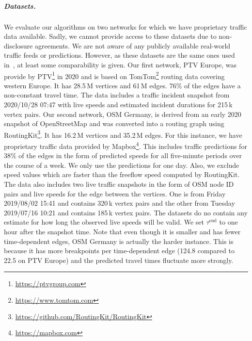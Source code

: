 \documentclass[a4paper,UKenglish,cleveref, autoref, thm-restate,anonymous]{lipics-v2021}
\begin{document}
\subparagraph{Datasets.}
We evaluate our algorithms on two networks for which we have proprietary traffic data available.
Sadly, we cannot provide access to these datasets due to non-disclosure agreements.
We are not aware of any publicly available real-world traffic feeds or predictions.
However, as these datasets are the same ones used in~\cite{swz-sfert-21,strasser_et_al:LIPIcs.SEA.2021.6}, at least some comparability is given.
%
Our first network, PTV Europe, was provide by PTV\footnote{\url{https://ptvgroup.com}} in 2020 and is based on TomTom\footnote{\url{https://www.tomtom.com}} routing data covering western Europe.
It has 28.5\,M vertices and 61\,M edges.
76\% of the edges have a non-constant travel time.
The data includes a traffic incident snapshot from 2020/10/28 07:47 with live speeds and estimated incident durations for 215\,k vertex pairs.
%
Our second network, OSM Germany, is derived from an early 2020 snapshot of OpenStreetMap and was converted into a routing graph using RoutingKit\footnote{\url{https://github.com/RoutingKit/RoutingKit}}.
It has 16.2\,M vertices and 35.2\,M edges.
For this instance, we have proprietary traffic data provided by Mapbox\footnote{\url{https://mapbox.com}}.
This includes traffic predictions for 38\% of the edges in the form of predicted speeds for all five-minute periods over the course of a week.
We only use the predictions for one day.
Also, we exclude speed values which are faster than the freeflow speed computed by RoutingKit.
The data also includes two live traffic snapshots in the form of OSM node ID pairs and live speeds for the edge between the vertices.
One is from Friday 2019/08/02 15:41 and contains 320\,k vertex pairs and the other from Tuesday 2019/07/16 10:21 and contains 185\,k vertex pairs.
The datasets do no contain any estimate for how long the observed live speeds will be valid.
We set $\tau^{\operatorname{end}}$ to one hour after the snapshot time.
Note that even though it is smaller and has fewer time-dependent edges, OSM Germany is actually the harder instance.
This is because it has more breakpoints per time-dependent edge (124.8 compared to 22.5 on PTV Europe) and the predicted travel times fluctuate more strongly.
\end{document}
